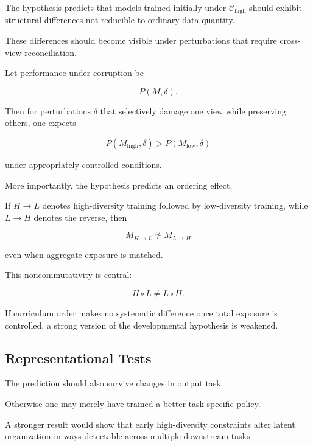 \documentclass[11pt]{article}
\theoremstyle{remark}
\begin{document}
The hypothesis predicts that models trained initially under $\mathcal{C}_{\mathrm{high}}$ should exhibit structural differences not reducible to ordinary data quantity.

These differences should become visible under perturbations that require cross-view reconciliation.

Let performance under corruption be

\begin{equation}
P(M,\delta).
\end{equation}

Then for perturbations $\delta$ that selectively damage one view while preserving others, one expects

\begin{equation}
P(M_{\mathrm{high}},\delta)
>
P(M_{\mathrm{low}},\delta)
\end{equation}

under appropriately controlled conditions.

More importantly, the hypothesis predicts an ordering effect.

If $H\rightarrow L$ denotes high-diversity training followed by low-diversity training, while $L\rightarrow H$ denotes the reverse, then

\begin{equation}
M_{H\rightarrow L}
\not\simeq
M_{L\rightarrow H}
\end{equation}

even when aggregate exposure is matched.

This noncommutativity is central:

\begin{equation}
\boxed{
H\circ L
\neq
L\circ H.
}
\end{equation}

If curriculum order makes no systematic difference once total exposure is controlled, a strong version of the developmental hypothesis is weakened.

\subsection{Representational Tests}

The prediction should also survive changes in output task.

Otherwise one may merely have trained a better task-specific policy.

A stronger result would show that early high-diversity constraints alter latent organization in ways detectable across multiple downstream tasks.
\end{document}
